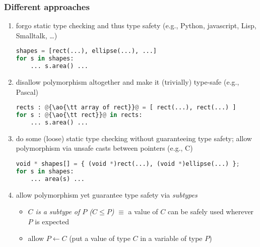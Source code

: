 \documentclass[12pt,dvipdfmx]{beamer}
\newcommand{\ao}[1]{{\color{blue}#1}}
\begin{document}
\begin{frame}
  \frametitle{Different approaches}

  \begin{enumerate}
  \item forgo static type checking and thus type safety
    (e.g., Python, javascript, Lisp, Smalltalk, \ldots)

\begin{lstlisting}[language=python]
shapes = [rect(...), ellipse(...), ...]
for s in shapes:
    ... s.area() ...
\end{lstlisting}
    
  \item disallow polymorphism altogether and make it (trivially) type-safe
    (e.g., Pascal)

\begin{lstlisting}[language=python]
rects : @{\ao{\tt array of rect}}@ = [ rect(...), rect(...) ]
for s : @{\ao{\tt rect}}@ in rects:
    ... s.area() ...
\end{lstlisting}
  \item do some (loose) static type checking without guaranteeing type safety;
    allow polymorphism via unsafe casts between pointers (e.g., C)

\begin{lstlisting}[language=python]
void * shapes[] = { (void *)rect(...), (void *)ellipse(...) };
for s in shapes:
    ... area(s) ...
\end{lstlisting}

  \item allow polymorphism yet guarantee type safety via \ao{\it subtypes}
    \begin{itemize}
    \item \ao{\it $C$ is a subtype of $P$ ($C \leq P$)} $\equiv$
      a value of $C$ can be safely used wherever $P$ is expected
    \item allow $P \leftarrow C$
      (put a value of type $C$ in a variable of type $P$)
    \end{itemize}
  \end{enumerate}
\end{frame}
\end{document}
